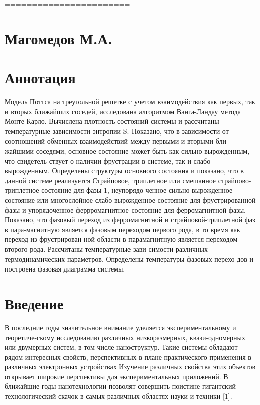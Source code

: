 
=======================


\section{Магомедов М.А.}








\section{Аннотация}

Модель Поттса на треугольной решетке с учетом взаимодействия как первых, так и вторых ближайших соседей, исследована алгоритмом Ванга-Ландау метода Монте-Карло. Вычислена плотность состояний системы и рассчитаны температурные зависимости энтропии S. Показано, что в зависимости от соотношений обменных взаимодействий между первыми и вторыми бли-жайшими соседями, основное состояние может быть как сильно вырожденным, что свидетель-ствует о наличии фрустрации в системе, так и слабо вырожденным.
Определены структуры основного состояния и показано, что в данной системе реализуется Страйповое, триплетное или смешанное страйпово-триплетное состояние для фазы 1, неупорядо-ченное сильно вырожденное состояние или многослойное слабо вырожденное состояние для фрустрированной фазы и упорядоченное феррромагнитное состояние для ферромагнитной фазы.
Показано, что фазовый переход из ферромагнитной и страйповой-триплетной фаз в пара-магнитную является фазовым переходом первого рода, в то время как переход из фрустрирован-ной области в парамагнитную является переходом второго рода. Рассчитаны температурные зави-симости различных термодинамических параметров. Определены температуры фазовых перехо-дов и построена фазовая диаграмма системы.




\section{Введение}


В последние годы  значительное внимание уделяется экспериментальному и теоретиче-скому исследованию различных низкоразмерных, квази-одномерных или двумерных систем, в том числе наноструктур. Такие системы обладают рядом интересных свойств, перспективных в плане практического применения в различных электронных устройствах Изучение различных свойства этих объектов открывает широкие перспективы для экспериментальных приложений. В ближайшие годы нанотехнологии позволят совершить поистине гигантский технологический скачок в самых различных областях науки и техники [1].

